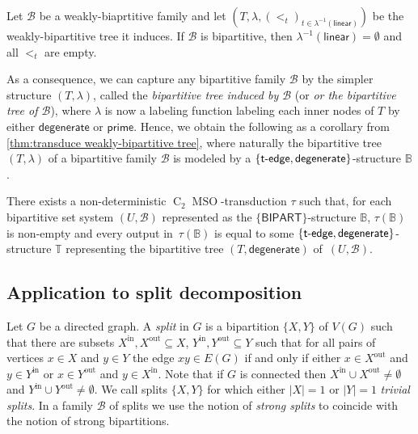 \documentclass{lmcs} %
\newcommand{\MSO}{\ensuremath{\operatorname{MSO}}\xspace}
\newcommand{\CMSO}[1][]{\ensuremath{\C[#1]{\!\!}\MSO}\xspace}
\newcommand{\C}[1][]{\ensuremath{\operatorname{C}_{#1}}\xspace}
\newcommand{\tedge}{\ensuremath{\mathsf{t}\text-\mathsf{edge}}\xspace}
\newcommand{\BIPARTITION}{\ensuremath{\mathsf{BIPART}}\xspace}
\newcommand\DEGENERATE{\ensuremath{\mathsf{degenerate}}\xspace}
\newcommand\PRIME{\ensuremath{\mathsf{prime}}\xspace}
\newcommand\LINEAR{\ensuremath{\mathsf{linear}}\xspace}
\newcommand{\inNeighbours}{\operatorname{in}}
\newcommand{\outNeighbours}{\operatorname{out}}
\newcommand{\ifof}{if and only if\xspace}
\begin{document}
\begin{thmC}
    Let $\mathcal{B}$ be a weakly-biaprtitive family and let \linebreak $(T,\lambda,(<_t)_{t\in \lambda^{-1}(\LINEAR)})$ be the weakly-bipartitive tree it induces. If $\mathcal{B}$ is bipartitive, then $\lambda^{-1}(\LINEAR)=\emptyset$ and all $<_t$ are empty.
\end{thmC}
As a consequence, we can capture any bipartitive family $\mathcal{B}$ by the simpler structure $(T,\lambda)$, called the \emph{bipartitive tree induced by $\mathcal{B}$} (or \emph{or the bipartitive tree of $\mathcal{B}$}), where $\lambda$ is now a labeling function labeling each inner nodes of $T$ by either $\DEGENERATE$ or $\PRIME$.
Hence, we obtain the following as a corollary from \autoref{thm:transduce weakly-bipartitive tree}, where naturally the bipartitive tree $(T,\lambda)$ of a bipartitive family $\mathcal{B}$ is modeled by a $\{\tedge,\DEGENERATE\}$-structure $\mathbb{B}$.
\begin{cor}
    There exists a non-deterministic \CMSO[2]-transduction $\tau$ such that,
    for each bipartitive set system $(U,\mathcal{B})$ represented as the $\{\BIPARTITION\}$-structure $\mathbb{B}$,
    $\tau(\mathbb{B})$ is non-empty and every output in~$\tau(\mathbb{B})$
    is equal to some $\{\tedge,\DEGENERATE\}$-structure $\mathbb{T}$ representing the bipartitive tree $(T,\DEGENERATE)$ of~$(U,\mathcal{B})$.
\end{cor}


\subsection{Application to split decomposition}
Let $G$ be a directed graph.
A \emph{split} in $G$ is a bipartition $\{X,Y\}$ of $V(G)$ such that there are subsets $X^{\inNeighbours},X^{\outNeighbours}\subseteq X$, $Y^{\inNeighbours},Y^{\outNeighbours}\subseteq Y$ such that for all pairs of vertices $x\in X$ and $y\in Y$ the edge $xy\in E(G)$ \ifof either $x\in X^{\outNeighbours}$ and $y\in Y^{\inNeighbours}$ or $x\in Y^{\outNeighbours}$ and $y\in X^{\inNeighbours}$. Note that if $G$ is connected then $X^{\inNeighbours}\cup X^{\outNeighbours}\not=\emptyset$ and $Y^{\inNeighbours}\cup Y^{\outNeighbours}\not=\emptyset$. We call splits $\{X,Y\}$ for which either $|X|=1$ or $|Y|=1$ \emph{trivial splits}.
In a family $\mathcal{B}$ of splits we use the notion of \emph{strong splits} to coincide with the notion of strong bipartitions.
\end{document}

